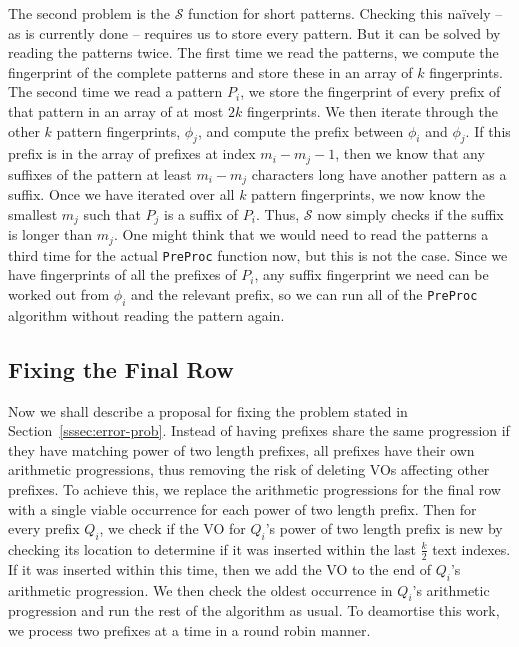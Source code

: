 \documentclass[ %
                    author={Dominic Joseph Moylett},
                    degree={MEng},
                     title={Dictionary Matching with Fingerprints},
                  subtitle={An Empirical Analysis},
                      type={research},
                      year={2015} ]{dissertation}
\begin{document}
The second problem is the $\mathcal{S}$ function for short patterns. Checking this na\"{i}vely -- as is currently done -- requires us to store every pattern. But it can be solved by reading the patterns twice. The first time we read the patterns, we compute the fingerprint of the complete patterns and store these in an array of $k$ fingerprints. The second time we read a pattern $P_i$, we store the fingerprint of every prefix of that pattern in an array of at most $2k$ fingerprints. We then iterate through the other $k$ pattern fingerprints, $\phi_j$, and compute the prefix between $\phi_i$ and $\phi_j$. If this prefix is in the array of prefixes at index $m_i - m_j - 1$, then we know that any suffixes of the pattern at least $m_i - m_j$ characters long have another pattern as a suffix. Once we have iterated over all $k$ pattern fingerprints, we now know the smallest $m_j$ such that $P_j$ is a suffix of $P_i$. Thus, $\mathcal{S}$ now simply checks if the suffix is longer than $m_j$. One might think that we would need to read the patterns a third time for the actual \texttt{PreProc} function now, but this is not the case. Since we have fingerprints of all the prefixes of $P_i$, any suffix fingerprint we need can be worked out from $\phi_i$ and the relevant prefix, so we can run all of the \texttt{PreProc} algorithm without reading the pattern again.

\subsection{Fixing the Final Row}
\label{ssec:error-fix}

Now we shall describe a proposal for fixing the problem stated in Section~\ref{sssec:error-prob}. Instead of having prefixes share the same progression if they have matching power of two length prefixes, all prefixes have their own arithmetic progressions, thus removing the risk of deleting VOs affecting other prefixes. To achieve this, we replace the arithmetic progressions for the final row with a single viable occurrence for each power of two length prefix. Then for every prefix $Q_i$, we check if the VO for $Q_i$'s power of two length prefix is new by checking its location to determine if it was inserted within the last $\frac{k}{2}$ text indexes. If it was inserted within this time, then we add the VO to the end of $Q_i$'s arithmetic progression. We then check the oldest occurrence in $Q_i$'s arithmetic progression and run the rest of the algorithm as usual. To deamortise this work, we process two prefixes at a time in a round robin manner.
\end{document}
